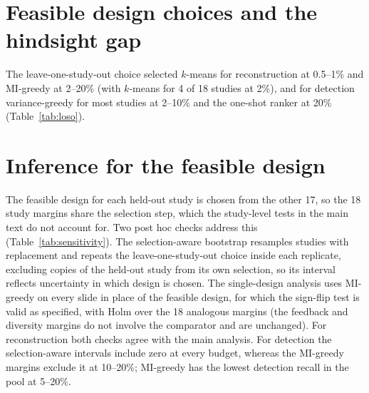 \documentclass[10pt]{article}
\newcommand{\fittable}[1]{\resizebox{\ifdim\width>\linewidth\linewidth\else\width\fi}{!}{#1}}
\begin{document}
\begin{table}[H]
\centering
\caption{Stage-1 local-variance policy minus the hindsight benchmark of the coverage designs at 10\% budget under
batched and contiguous acquisition. $\Delta$ with unadjusted 95\% CI resampling studies; $p_H$ Holm-adjusted over the
24 stage-1 primary margins.}
\label{tab:realism}
\fittable{}
\end{table}

\begin{table}[H]
\centering
\caption{Stage-1 ROI-detection recall, mean over 22 slides. $^\dagger$Reimplementations of the stated objectives of
SCR$^2$-ST (diversity, non-adaptive) and SOFisher (ROI-seeking, adaptive). $^\ast$Ground-truth ordering.}
\label{tab:stage1abs}
\fittable{\small}
\end{table}

\section{Feasible design choices and the hindsight gap}
\label{app:comparators}

The leave-one-study-out choice selected $k$-means for reconstruction at 0.5--1\% and MI-greedy at 2--20\% (with $k$-means for
4 of 18 studies at 2\%), and for detection variance-greedy for most studies at 2--10\% and the one-shot ranker at
20\% (Table~\ref{tab:loso}).

\begin{table}[H]
\centering
\caption{Designs chosen on the other studies (number of held-out studies, of 18) and the difference between the
hindsight benchmark and the feasible design for reconstruction (unadjusted 95\% CI resampling studies).}
\label{tab:loso}
\fittable{}
\end{table}

\section{Inference for the feasible design}
\label{app:sensitivity}

The feasible design for each held-out study is chosen from the other 17, so the 18 study margins share the
selection step, which the study-level tests in the main text do not account for. Two post hoc checks address this
(Table~\ref{tab:sensitivity}). The selection-aware bootstrap resamples studies with replacement and repeats the
leave-one-study-out choice inside each replicate, excluding copies of the held-out study from its own selection, so
its interval reflects uncertainty in which design is chosen. The single-design analysis uses MI-greedy on every
slide in place of the feasible design, for which the sign-flip test is valid as specified, with Holm over the 18
analogous margins (the feedback and diversity margins do not involve the comparator and are unchanged). For
reconstruction both checks agree with the main analysis. For detection the selection-aware intervals include zero at
every budget, whereas the MI-greedy margins exclude it at 10--20\%; MI-greedy has the lowest detection recall
in the pool at 5--20\%.
\end{document}

